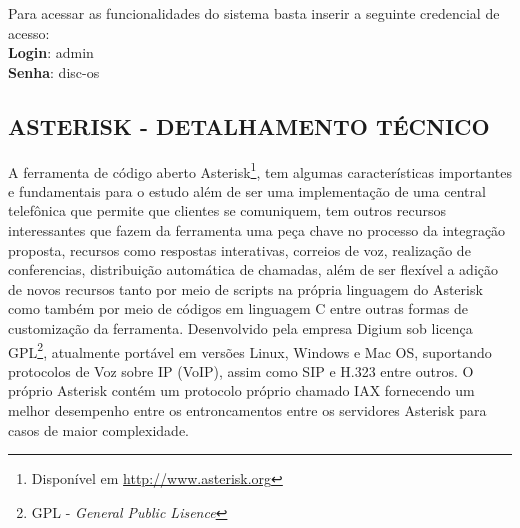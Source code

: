 Para acessar as funcionalidades do sistema basta inserir a seguinte credencial de acesso:\\
\textbf{Login}: admin\\
\textbf{Senha}: disc-os\\


\subsection{\textbf{\uppercase{Asterisk - Detalhamento Técnico}}}
A ferramenta de código aberto Asterisk\footnote{Disponível em \url{http://www.asterisk.org}}, tem algumas características importantes e fundamentais para o estudo além de ser uma implementação de uma central telefônica que permite que clientes se comuniquem, tem outros recursos interessantes que fazem da ferramenta uma peça chave no processo da integração proposta, recursos como respostas interativas, correios de voz, realização de conferencias, distribuição automática de chamadas, além de ser flexível a adição de novos recursos tanto por meio de scripts na própria linguagem do Asterisk como também por meio de códigos em linguagem C entre outras formas de customização da ferramenta. Desenvolvido pela empresa Digium sob licença GPL\footnote{GPL - \textit{General Public Lisence}}, atualmente portável em versões Linux, Windows e Mac OS, suportando protocolos de Voz sobre IP (VoIP), assim como SIP e H.323 entre outros. O próprio Asterisk contém um protocolo próprio chamado IAX fornecendo um melhor desempenho entre os entroncamentos entre os servidores Asterisk para casos de maior complexidade.
